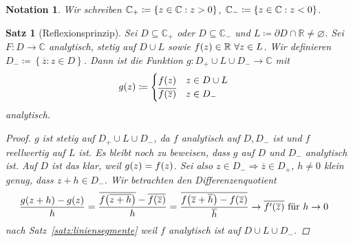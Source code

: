 \documentclass[11pt, a4paper]{article}
\theoremstyle{plain}
\newtheorem{satz}[blockelement]{Satz}
\newtheorem{notation}[blockelement]{Notation}
\numberwithin{equation}{subsection}
\newcommand{\set}[1]{\left\{#1\right\}}
\newcommand{\of}[1]{\mathopen{}\mathclose{}\bgroup\left(#1\aftergroup\egroup\right)}
\newcommand{\impl}[0]{\Rightarrow{}}
\renewcommand{\emptyset}{\varnothing}
\newcommand{\conj}[1]{\overline{#1}}
\let\Im\relax
\DeclareMathOperator{\Im}{Im}
\newcommand{\R}{\mathbb{R}}
\newcommand{\C}{\mathbb{C}}
\begin{document}
    \begin{notation}
        Wir schreiben $\C_+\coloneqq\set{z\in\C: \Im z > 0}$, $\C_- \coloneqq \set{z\in \C: \Im z < 0}$.
    \end{notation}

    \begin{satz}[Reflexionsprinzip] %
        \label{satz:reflexionsprinzip}
        Sei $D\subseteq\C_+$ oder $D\subseteq\C_-$ und $L\coloneqq \partial D \cap \R \neq \emptyset$. Sei $F: D\to\C$ analytisch, stetig auf $D \cup L$ sowie $f\of{z} \in\R~\forall z\in L$. Wir definieren $D_- \coloneqq \set{\conj{z}: z\in D}$. Dann ist die Funktion $g: D_+ \cup L \cup D_- \to \C$ mit
        \begin{align*}
            g\of{z} &\coloneqq \begin{cases}
                                   f\of{z} &z \in D \cup L\\
                                   \conj{f\of{\conj{z}}} &z\in D_-
            \end{cases}
        \end{align*}
        analytisch.

        \begin{proof}
            $g$ ist stetig auf $D_+ \cup L \cup D_-$, da $f$ analytisch auf $D, D_-$ ist und $f$ reellwertig auf $L$ ist. Es bleibt noch zu beweisen, dass $g$ auf $D$ und $D_-$ analytisch ist. Auf $D$ ist das klar, weil $g\of{z} = f\of{z}$. Sei also $z\in D_-\impl \conj{z}\in D_+$, $h\neq 0$ klein genug, dass $z + h \in D_-$. Wir betrachten den Differenzenquotient
            \begin{align*}
                \frac{g\of{z+h} - g\of{z}}{h} &= \frac{\conj{f\of{\conj{z+h}}} - \conj{f\of{\conj{z}}}}{h} = \frac{\conj{f\of{\conj{z} + \conj{h}} - f\of{\conj{z}}}}{\conj{h}} \to \conj{f'\of{\conj{z}}} \text{ für } h\to 0
            \end{align*}
            nach Satz~\ref{satz:liniensegmente} weil $f$ analytisch ist auf $D\cup L \cup D_-$.
        \end{proof}
    \end{satz}
\end{document}
